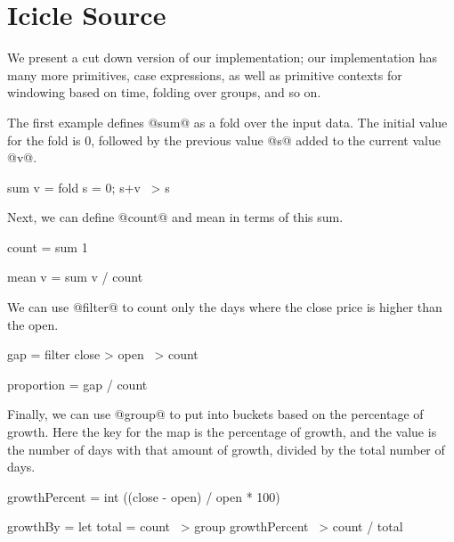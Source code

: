 \section{Icicle Source}
\label{s:Source}

We present a cut down version of our implementation; our implementation has many more primitives, case expressions, as well as primitive contexts for windowing based on time, folding over groups, and so on.

The first example defines @sum@ as a fold over the input data.
The initial value for the fold is $0$, followed by the previous value @s@ added to the current value @v@.
\begin{code}
sum v
 =  fold s = 0; s+v
 ~> s
\end{code}

Next, we can define @count@ and mean in terms of this sum.
\begin{code}
count
 =  sum 1

mean v
 =  sum v / count
\end{code}

We can use @filter@ to count only the days where the close price is higher than the open.
\begin{code}
gap
 =  filter close > open
 ~> count

proportion
 =  gap / count
\end{code}

Finally, we can use @group@ to put into buckets based on the percentage of growth.
Here the key for the map is the percentage of growth, and the value is the number of days with that amount of growth, divided by the total number of days.
\begin{code}
growthPercent
 =  int ((close - open) / open * 100)

growthBy
 =  let total = count
 ~> group growthPercent
 ~> count / total
\end{code}





